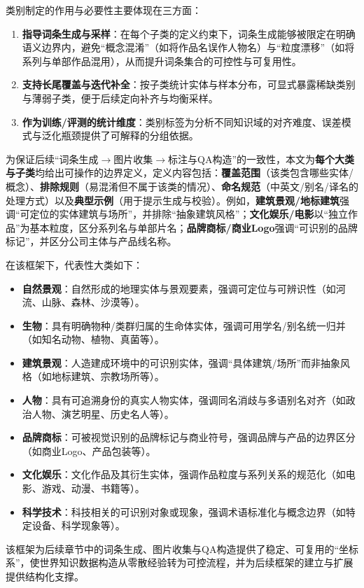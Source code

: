 类别制定的作用与必要性主要体现在三方面：
\begin{enumerate}
  \item \textbf{指导词条生成与采样}：在每个子类的定义约束下，词条生成能够被限定在明确语义边界内，避免“概念混淆”（如将作品名误作人物名）与“粒度漂移”（如将系列与单部作品混用），从而提升词条集合的可控性与可复用性。
  \item \textbf{支持长尾覆盖与迭代补全}：按子类统计实体与样本分布，可显式暴露稀缺类别与薄弱子类，便于后续定向补齐与均衡采样。
  \item \textbf{作为训练/评测的统计维度}：类别标签为分析不同知识域的对齐难度、误差模式与泛化瓶颈提供了可解释的分组依据。
\end{enumerate}

为保证后续“词条生成$\rightarrow$图片收集$\rightarrow$标注与QA构造”的一致性，本文为\textbf{每个大类与子类}均给出可操作的边界定义，定义内容包括：\textbf{覆盖范围}（该类包含哪些实体/概念）、\textbf{排除规则}（易混淆但不属于该类的情况）、\textbf{命名规范}（中英文/别名/译名的处理方式）以及\textbf{典型示例}（用于提示生成与校验）。例如，\textbf{建筑景观/地标建筑}强调“可定位的实体建筑与场所”，并排除“抽象建筑风格”；\textbf{文化娱乐/电影}以“独立作品”为基本粒度，区分系列名与单部片名；\textbf{品牌商标/商业Logo}强调“可识别的品牌标记”，并区分公司主体与产品线名称。

在该框架下，代表性大类如下：
\begin{itemize}
  \item \textbf{自然景观}：自然形成的地理实体与景观要素，强调可定位与可辨识性（如河流、山脉、森林、沙漠等）。
  \item \textbf{生物}：具有明确物种/类群归属的生命体实体，强调可用学名/别名统一归并（如知名动物、植物、真菌等）。
  \item \textbf{建筑景观}：人造建成环境中的可识别实体，强调“具体建筑/场所”而非抽象风格（如地标建筑、宗教场所等）。
  \item \textbf{人物}：具有可追溯身份的真实人物实体，强调同名消歧与多语别名对齐（如政治人物、演艺明星、历史名人等）。
  \item \textbf{品牌商标}：可被视觉识别的品牌标记与商业符号，强调品牌与产品的边界区分（如商业Logo、产品包装等）。
  \item \textbf{文化娱乐}：文化作品及其衍生实体，强调作品粒度与系列关系的规范化（如电影、游戏、动漫、书籍等）。
  \item \textbf{科学技术}：科技相关的可识别对象或现象，强调术语标准化与概念边界（如特定设备、科学现象等）。
\end{itemize}
该框架为后续章节中的词条生成、图片收集与QA构造提供了稳定、可复用的“坐标系”，使世界知识数据构造从零散经验转为可控流程，并为后续框架的建立与扩展提供结构化支撑。

